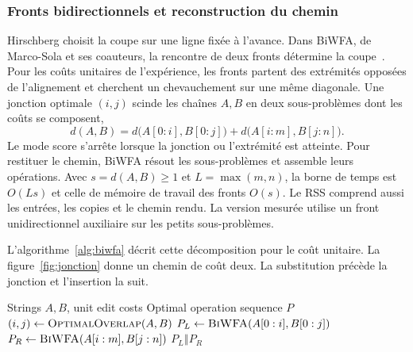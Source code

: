 \subsubsection{Fronts bidirectionnels et reconstruction du chemin}\label{sec:biwfa}
Hirschberg choisit la coupe sur une ligne fixée à l’avance. Dans BiWFA, de Marco-Sola et ses coauteurs, la rencontre de deux fronts détermine la coupe~\cite{biwfa}. Pour les coûts unitaires de l’expérience, les fronts partent des extrémités opposées de l’alignement et cherchent un chevauchement sur une même diagonale. Une jonction optimale \((i,j)\) scinde les chaînes \(A,B\) en deux sous-problèmes dont les coûts se composent,
\[
 d(A,B)=d\bigl(A[0:i],B[0:j]\bigr)+d\bigl(A[i:m],B[j:n]\bigr).
\]
Le mode score s'arrête lorsque la jonction ou l'extrémité est atteinte. Pour restituer le chemin, BiWFA résout les sous-problèmes et assemble leurs opérations. Avec \(s=d(A,B)\ge1\) et \(L=\max(m,n)\), la borne de temps est \(O(Ls)\) et celle de mémoire de travail des fronts \(O(s)\). Le RSS comprend aussi les entrées, les copies et le chemin rendu. La version mesurée utilise un front unidirectionnel auxiliaire sur les petits sous-problèmes.

L'algorithme~\ref{alg:biwfa} décrit cette décomposition pour le coût unitaire. La figure~\ref{fig:jonction} donne un chemin de coût deux. La substitution précède la jonction et l'insertion la suit.
\begin{algorithm}[htbp]
\caption{Reconstruction d'un chemin par fronts bidirectionnels}\label{alg:biwfa}
\begin{algorithmic}[1]
\Require Strings \(A,B\), unit edit costs
\Ensure Optimal operation sequence \(P\)
  \State \Return {}
\EndIf
\State \((i,j)\gets\Call{OptimalOverlap}{A,B}\) 
\State \(P_L\gets\Call{BiWFA}{A[0:i],B[0:j]}\)
\State \(P_R\gets\Call{BiWFA}{A[i:m],B[j:n]}\)
\State \Return \(P_L\mathbin{\Vert}P_R\)
\end{algorithmic}
\end{algorithm}

